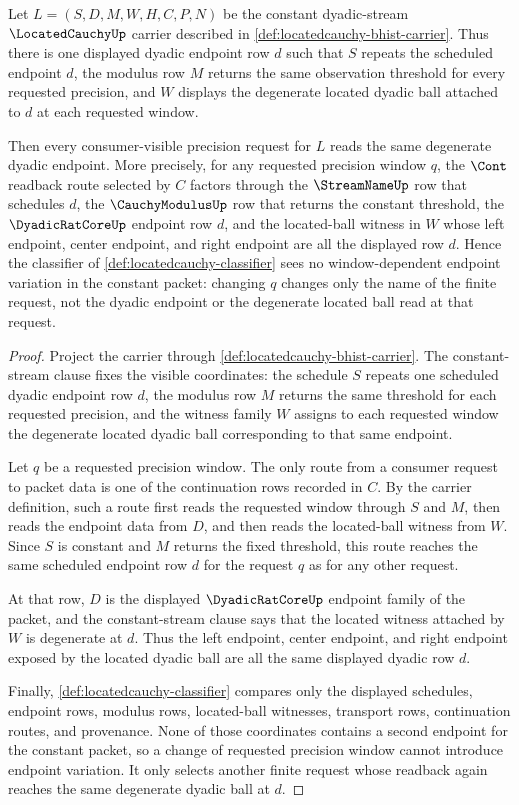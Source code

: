 \begin{theorem}
\label{thm:locatedcauchy-constant-window-degeneracy}
Let $L=(S,D,M,W,H,C,P,N)$ be the constant dyadic-stream $\LocatedCauchyUp$ carrier described in \autoref{def:locatedcauchy-bhist-carrier}. Thus there is one displayed dyadic endpoint row $d$ such that $S$ repeats the scheduled endpoint $d$, the modulus row $M$ returns the same observation threshold for every requested precision, and $W$ displays the degenerate located dyadic ball attached to $d$ at each requested window.

Then every consumer-visible precision request for $L$ reads the same degenerate dyadic endpoint. More precisely, for any requested precision window $q$, the $\Cont$ readback route selected by $C$ factors through the $\StreamNameUp$ row that schedules $d$, the $\CauchyModulusUp$ row that returns the constant threshold, the $\DyadicRatCoreUp$ endpoint row $d$, and the located-ball witness in $W$ whose left endpoint, center endpoint, and right endpoint are all the displayed row $d$. Hence the classifier of \autoref{def:locatedcauchy-classifier} sees no window-dependent endpoint variation in the constant packet: changing $q$ changes only the name of the finite request, not the dyadic endpoint or the degenerate located ball read at that request.
\end{theorem}
\begin{proof}
Project the carrier through \autoref{def:locatedcauchy-bhist-carrier}. The constant-stream clause fixes the visible coordinates: the schedule $S$ repeats one scheduled dyadic endpoint row $d$, the modulus row $M$ returns the same threshold for each requested precision, and the witness family $W$ assigns to each requested window the degenerate located dyadic ball corresponding to that same endpoint.

Let $q$ be a requested precision window. The only route from a consumer request to packet data is one of the continuation rows recorded in $C$. By the carrier definition, such a route first reads the requested window through $S$ and $M$, then reads the endpoint data from $D$, and then reads the located-ball witness from $W$. Since $S$ is constant and $M$ returns the fixed threshold, this route reaches the same scheduled endpoint row $d$ for the request $q$ as for any other request.

At that row, $D$ is the displayed $\DyadicRatCoreUp$ endpoint family of the packet, and the constant-stream clause says that the located witness attached by $W$ is degenerate at $d$. Thus the left endpoint, center endpoint, and right endpoint exposed by the located dyadic ball are all the same displayed dyadic row $d$.

Finally, \autoref{def:locatedcauchy-classifier} compares only the displayed schedules, endpoint rows, modulus rows, located-ball witnesses, transport rows, continuation routes, and provenance. None of those coordinates contains a second endpoint for the constant packet, so a change of requested precision window cannot introduce endpoint variation. It only selects another finite request whose readback again reaches the same degenerate dyadic ball at $d$.
\end{proof}

